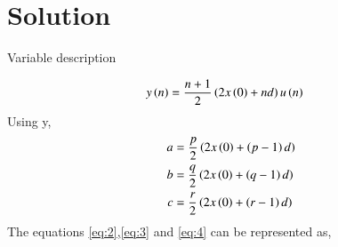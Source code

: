 \documentclass[journal,12pt,twocolumn]{IEEEtran}
\theoremstyle{remark}
\begin{document}
\section*{Solution}
\begin{table}[h]
    \centering
    
    \caption{Variable description}
    \label{tab:11.9.2.11.1}
\end{table}
\begin{align}
    y\left(n\right)&=\dfrac{n+1}{2}\left(2x\left(0\right)+nd\right)u\left(n\right)
\end{align}
Using y,
\begin{align}
    a&=\dfrac{p}{2}\left(2x\left(0\right)+\left(p-1\right)d\right)\label{eq:2}\\
    b&=\dfrac{q}{2}\left(2x\left(0\right)+\left(q-1\right)d\right)\label{eq:3}\\
    c&=\dfrac{r}{2}\left(2x\left(0\right)+\left(r-1\right)d\right)\label{eq:4}
\end{align}
The equations \eqref{eq:2},\eqref{eq:3} and \eqref{eq:4} can be represented as,
\end{document}

